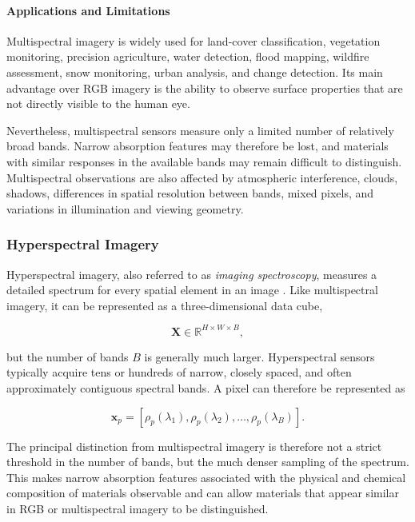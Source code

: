 \documentclass[11pt,a4paper]{article}
\begin{document}
\paragraph{Applications and Limitations}

Multispectral imagery is widely used for land-cover classification,
vegetation monitoring, precision agriculture, water detection, flood
mapping, wildfire assessment, snow monitoring, urban analysis, and
change detection. Its main advantage over RGB imagery is the ability to
observe surface properties that are not directly visible to the human
eye.

Nevertheless, multispectral sensors measure only a limited number of
relatively broad bands. Narrow absorption features may therefore be
lost, and materials with similar responses in the available bands may
remain difficult to distinguish. Multispectral observations are also
affected by atmospheric interference, clouds, shadows, differences in
spatial resolution between bands, mixed pixels, and variations in
illumination and viewing geometry.

\subsubsection{Hyperspectral Imagery}

Hyperspectral imagery, also referred to as \textit{imaging spectroscopy},
measures a detailed spectrum for every spatial element in an image
\cite{jpl_imaging_spectroscopy}. Like multispectral imagery, it can be
represented as a three-dimensional data cube,

\[
\mathbf{X}\in\mathbb{R}^{H\times W\times B},
\]

but the number of bands \(B\) is generally much larger. Hyperspectral
sensors typically acquire tens or hundreds of narrow, closely spaced,
and often approximately contiguous spectral bands. A pixel can therefore
be represented as

\[
\mathbf{x}_p =
\left[
\rho_p(\lambda_1),
\rho_p(\lambda_2),
\ldots,
\rho_p(\lambda_B)
\right].
\]

The principal distinction from multispectral imagery is therefore not a
strict threshold in the number of bands, but the much denser sampling of
the spectrum. This makes narrow absorption features associated with the
physical and chemical composition of materials observable and can allow
materials that appear similar in RGB or multispectral imagery to be
distinguished.
\end{document}
